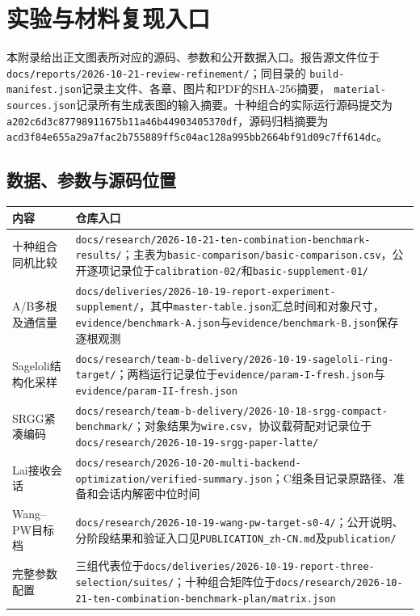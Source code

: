 \chapter{实验与材料复现入口}

本附录给出正文图表所对应的源码、参数和公开数据入口。报告源文件位于
\nolinkurl{docs/reports/2026-10-21-review-refinement/}；同目录的
\nolinkurl{build-manifest.json}记录主文件、各章、图片和PDF的SHA-256摘要，
\nolinkurl{material-sources.json}记录所有生成表图的输入摘要。十种组合的实际运行源码提交为
\texttt{a202c6d3c87798911675b11a46b44903405370df}，源码归档摘要为
\texttt{acd3f84e655a29a7fac2b755889ff5c04ac128a995bb2664bf91d09c7ff614dc}。

\section{数据、参数与源码位置}

\begin{longtable}{@{}>{\raggedright\arraybackslash}p{}>{\raggedright\arraybackslash}p{}@{}}
\toprule
\rowcolor{black!8} 内容 & 仓库入口 \\
\midrule
十种组合同机比较 & \nolinkurl{docs/research/2026-10-21-ten-combination-benchmark-results/}；主表为\nolinkurl{basic-comparison/basic-comparison.csv}，公开逐项记录位于\nolinkurl{calibration-02/}和\nolinkurl{basic-supplement-01/} \\
A/B多根及通信量 & \nolinkurl{docs/deliveries/2026-10-19-report-experiment-supplement/}，其中\nolinkurl{master-table.json}汇总时间和对象尺寸，\nolinkurl{evidence/benchmark-A.json}与\nolinkurl{evidence/benchmark-B.json}保存逐根观测 \\
Sageloli结构化采样 & \nolinkurl{docs/research/team-b-delivery/2026-10-19-sageloli-ring-target/}；两档运行记录位于\nolinkurl{evidence/param-I-fresh.json}与\nolinkurl{evidence/param-II-fresh.json} \\
SRGG紧凑编码 & \nolinkurl{docs/research/team-b-delivery/2026-10-18-srgg-compact-benchmark/}；对象结果为\nolinkurl{wire.csv}，协议载荷配对记录位于\nolinkurl{docs/research/2026-10-19-srgg-paper-latte/} \\
Lai接收会话 & \nolinkurl{docs/research/2026-10-20-multi-backend-optimization/verified-summary.json}；C组条目记录原路径、准备和会话内解密中位时间 \\
Wang--PW目标档 & \nolinkurl{docs/research/2026-10-19-wang-pw-target-s0-4/}；公开说明、分阶段结果和验证入口见\nolinkurl{PUBLICATION_zh-CN.md}及\nolinkurl{publication/} \\
完整参数配置 & 三组代表位于\nolinkurl{docs/deliveries/2026-10-19-report-three-selection/suites/}；十种组合矩阵位于\nolinkurl{docs/research/2026-10-21-ten-combination-benchmark-plan/matrix.json} \\
\bottomrule
\end{longtable}


